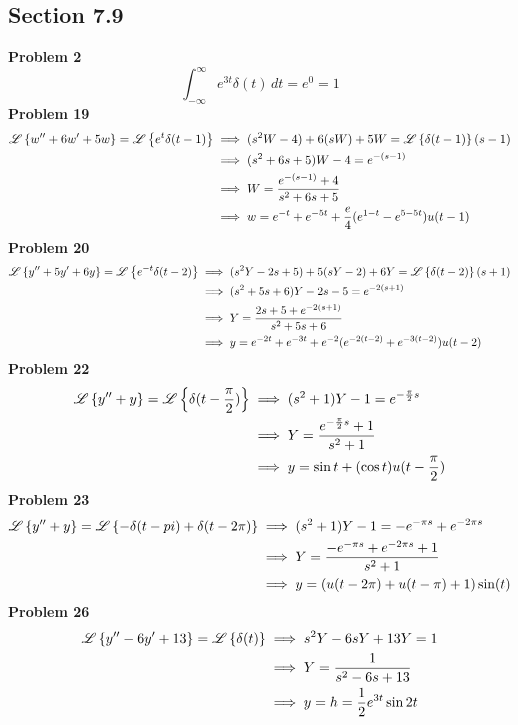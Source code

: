 \subsection*{Section 7.9}
\textbf{Problem 2}
\[
    \int_{-\infty}^\infty e^{3t}\delta(t) \,dt = e^0 = 1
\]
\textbf{Problem 19}
\begin{align*}
    \mathscr{L} \left\{ w'' + 6w' + 5w \right\} = \mathscr{L} \left\{ e^{t}\delta(t-1) \right\}
    &\implies (s^2W -4) + 6(sW) + 5W = \mathscr{L} \left\{ \delta(t-1) \right\}(s-1) \\
    &\implies (s^2+6s+5)W -4 =  e^{-(s-1)} \\
    &\implies W =  \frac{e^{-(s-1)} + 4}{s^2+6s+5}\\
    &\implies w = e^{-t} + e^{-5t} + \frac{e}{4}(e^{1-t}-e^{5-5t})u(t-1)
\end{align*}
\textbf{Problem 20}
\begin{align*}
    \mathscr{L} \left\{ y'' + 5y' + 6y \right\} = \mathscr{L} \left\{ e^{-t}\delta(t-2) \right\}
    &\implies (s^2Y - 2s + 5) + 5(sY - 2) + 6Y = \mathscr{L} \left\{ \delta(t-2) \right\}(s+1) \\
    &\implies (s^2+5s+6)Y -2s -5 =  e^{-2(s+1)} \\
    &\implies Y = \frac{2s+5+e^{-2(s+1)}}{s^2+5s+6} \\
    &\implies y = e^{-2t} + e^{-3t} + e^{-2}(e^{-2(t-2)}+e^{-3(t-2)})u(t-2)
\end{align*}
\textbf{Problem 22}
\begin{align*}
    \mathscr{L} \left\{ y'' + y \right\} = \mathscr{L} \left\{ \delta(t-\frac{\pi}{2}) \right\}
    &\implies (s^2+1)Y - 1 = e^{-\frac{\pi}{2}s} \\
    &\implies Y = \frac{e^{-\frac{\pi}{2}s}+1}{s^2+1} \\
    &\implies y = \sin t + (\cos t)u(t-\frac{\pi}{2})
\end{align*}
\textbf{Problem 23}
\begin{align*}
    \mathscr{L} \left\{ y'' + y \right\} = \mathscr{L} \left\{ -\delta(t-pi)+\delta(t-2\pi) \right\}
    &\implies (s^2+1)Y - 1 = -e^{-\pi s} + e^{-2\pi s} \\
    &\implies Y = \frac{-e^{-\pi s} + e^{-2\pi s}+1}{s^2+1} \\
    &\implies y = (u(t-2\pi)+u(t-\pi)+1)\sin(t)
\end{align*}
\textbf{Problem 26}
\begin{align*}
    \mathscr{L} \left\{ y'' - 6y' + 13 \right\} = \mathscr{L} \left\{ \delta(t) \right\}
    &\implies s^2Y - 6sY + 13Y = 1 \\
    &\implies Y = \frac{1}{s^2-6s+13} \\
    &\implies y = h = \frac{1}{2}{e^{3t}}\sin 2t
\end{align*}